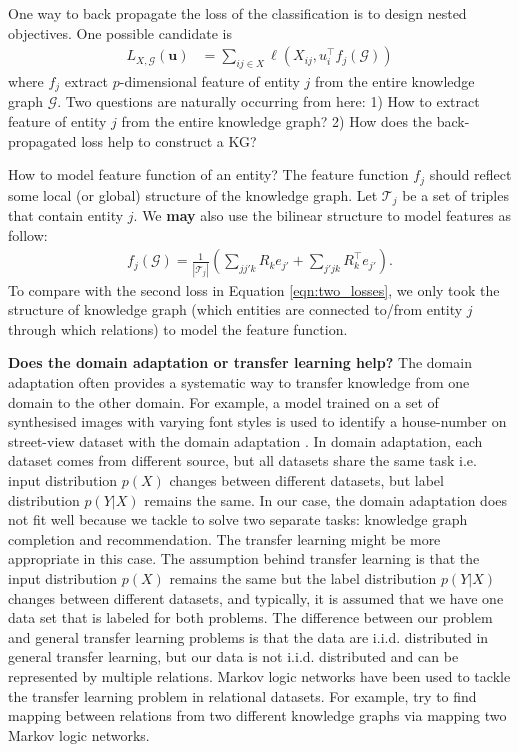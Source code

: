 \documentclass{article} %
\theoremstyle{definition}
\begin{document}
One way to back propagate the loss of the classification is to design nested objectives. One possible candidate is
\begin{align}
L_{X, \mathcal{G}}(\mathbf{u}) & = \sum_{ij \in X}\ell(X_{ij}, u_{i}^\top f_j(\mathcal{G}))
\end{align}
where $f_j$ extract $p$-dimensional feature of entity $j$ from the entire knowledge graph $\mathcal{G}$. Two questions are naturally occurring from here: 1) How to extract feature of entity $j$ from the entire knowledge graph? 2) How does the back-propagated loss help to construct a KG?

How to model feature function of an entity? The feature function $f_j$ should reflect some local (or global) structure of the knowledge graph.  Let $\mathcal{T}_j$ be a set of triples that contain entity $j$. We \textbf{may} also use the bilinear structure to model features as follow:
\begin{align}
f_j(\mathcal{G}) = \frac{1}{|\mathcal{T}_j|} ( \sum_{jj'k} R_k e_{j'} + \sum_{j'jk}R_k^\top e_{j'} ).
\end{align}
To compare with the second loss in Equation \ref{eqn:two_losses}, we only took the structure of knowledge graph (which entities are connected to/from entity $j$ through which relations) to model the feature function.

\textbf{Does the domain adaptation or transfer learning help?} The domain adaptation often provides a systematic way to transfer knowledge from one domain to the other domain. For example, a model trained on a set of synthesised images with varying font styles is used to identify a house-number on street-view dataset with the domain adaptation \cite{Ganin2015}. In domain adaptation, each dataset comes from different source, but all datasets share the same task i.e. input distribution $p(X)$ changes between different datasets, but label distribution $p(Y|X)$ remains the same. In our case, the domain adaptation does not fit well because we tackle to solve two separate tasks: knowledge graph completion and recommendation. The transfer learning might be more appropriate in this case. The assumption behind transfer learning is that the input distribution $p(X)$ remains the same but the label distribution $p(Y|X)$ changes between different datasets, and typically, it is assumed that we have one data set that is labeled for both problems. The difference between our problem and general transfer learning problems is that the data are i.i.d. distributed in general transfer learning, but our data is not i.i.d. distributed and can be represented by multiple relations. Markov logic networks have been used to tackle the transfer learning problem in relational datasets. For example, \cite{Mihalkova2007} try to find mapping between relations from two different knowledge graphs via mapping two Markov logic networks.




\end{document}
